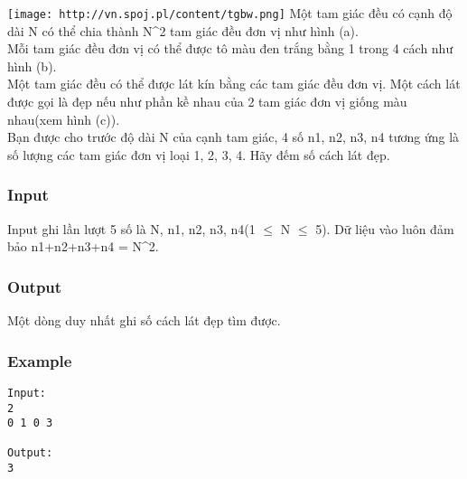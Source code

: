 




\texttt{[image: http://vn.spoj.pl/content/tgbw.png]}   Một tam giác đều có cạnh độ dài N có thể chia thành N\textasciicircum2 tam giác đều đơn vị như hình (a).   
\\   Mỗi tam giác đều đơn vị có thể được tô màu đen trắng bằng 1 trong 4 cách như hình (b).   
\\   Một tam giác đều có thể được lát kín bằng các tam giác đều đơn vị. Một cách lát được gọi là đẹp nếu như phần kề nhau của 2 tam giác đơn vị giống màu nhau(xem hình (c)).   
\\   Bạn được cho trước độ dài N của cạnh tam giác, 4 số n1, n2, n3, n4 tương ứng là số lượng các tam giác đơn vị loại 1, 2, 3, 4. Hãy đếm số cách lát đẹp.  

\subsubsection{   Input  }

   Input ghi lần lượt 5 số là N, n1, n2, n3, n4(1 $\le$ N $\le$ 5). Dữ liệu vào luôn đảm bảo n1+n2+n3+n4 = N\textasciicircum2.  

\subsubsection{   Output  }

   Một dòng duy nhất ghi số cách lát đẹp tìm được.  

\subsubsection{   Example  }
\begin{verbatim}
Input:
2
0 1 0 3

Output:
3
\end{verbatim}

